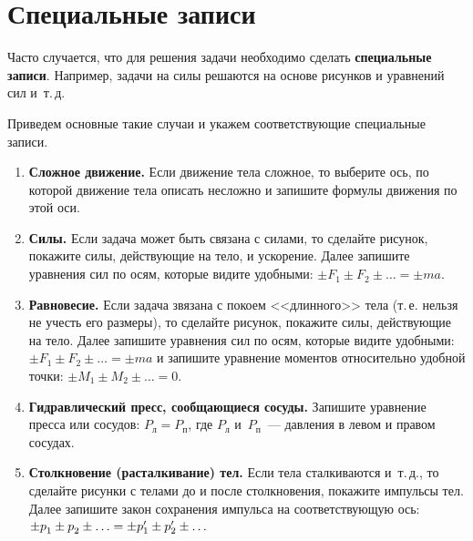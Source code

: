 \documentclass[main.tex]{subfiles}
\begin{document}

\pagestyle{empty}


\setcounter{section}{23
}
\addtocounter{section}{-1} 


\section{Специальные записи}

Часто случается, что для решения задачи необходимо сделать \textbf{специальные записи}. Например, задачи на силы решаются на основе рисунков и уравнений сил и~т.\,д. 

Приведем основные такие случаи и укажем соответствующие специальные записи.

\begin{enumerate}
    \item \textbf{Сложное движение.} Если движение тела сложное, то выберите ось, по которой движение тела описать несложно и запишите формулы движения по этой оси.  
    
    \item \textbf{Силы.} Если задача может быть связана с силами, то сделайте рисунок, покажите силы, действующие на тело, и ускорение. Далее запишите уравнения сил по осям, которые видите удобными: $\pm F_1\pm F_2\pm\ldots=\pm ma$.
    
    \item \textbf{Равновесие.} Если задача звязана с покоем <<длинного>> тела (т.\,е. нельзя не учесть его размеры), то сделайте рисунок, покажите силы, действующие на тело. Далее запишите уравнения сил по осям, которые видите удобными: $\pm F_1\pm F_2\pm\ldots=\pm ma$ и запишите уравнение моментов относительно удобной точки: $\pm M_1\pm M_2\pm\ldots=0$.  
    
    \item \textbf{Гидравлический пресс, сообщающиеся сосуды.} Запишите уравнение пресса или сосудов: $P_\text{л}=P_\text{п}$, где $P_\text{л}$ и~$P_\text{п}$~--- давления в левом и правом сосудах.

    \item \textbf{Столкновение (расталкивание) тел.} Если тела сталкиваются и~т.\,д., то сделайте рисунки с телами до и после столкновения, покажите импульсы тел. Далее запишите закон сохранения импульса на соответствующую ось: $\pm p^{\vphantom{'}}_\text{1} \pm p^{\vphantom{'}}_\text{2}\pm\ldots\hm = \pm p'_{1} \pm p'_{2}\pm\ldots$
    

\end{enumerate}
\end{document}
